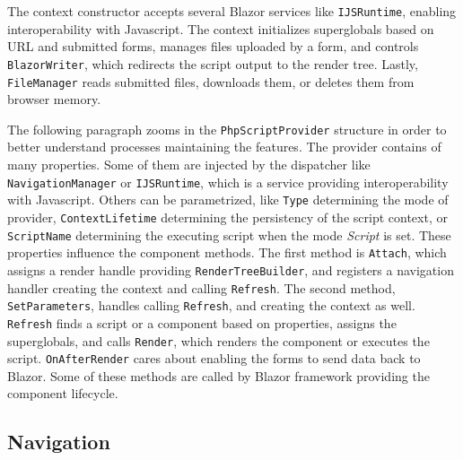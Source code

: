 The context constructor accepts several Blazor services like \texttt{IJSRuntime}, enabling interoperability with Javascript.
The context initializes superglobals based on URL and submitted forms, manages files uploaded by a form, and controls \texttt{BlazorWriter}, which redirects the script output to the render tree.
Lastly, \texttt{FileManager} reads submitted files, downloads them, or deletes them from browser memory.
\par
The following paragraph zooms in the \texttt{PhpScriptProvider} structure in order to better understand processes maintaining the features.
The provider contains of many properties.
Some of them are injected by the dispatcher like \texttt{NavigationManager} or \texttt{IJSRuntime}, which is a service providing interoperability with Javascript.
Others can be parametrized, like \texttt{Type} determining the mode of provider, \texttt{ContextLifetime} determining the persistency of the script context, or \texttt{ScriptName} determining the executing script when the mode \textit{Script} is set.
These properties influence the component methods.
The first method is \texttt{Attach}, which assigns a render handle providing \texttt{RenderTreeBuilder}, and registers a navigation handler creating the context and calling \texttt{Refresh}.
The second method, \texttt{SetParameters}, handles calling \texttt{Refresh}, and creating the context as well.
\texttt{Refresh} finds a script or a component based on properties, assigns the superglobals, and calls \texttt{Render}, which renders the component or executes the script.
\texttt{OnAfterRender} cares about enabling the forms to send data back to Blazor.
Some of these methods are called by Blazor framework providing the component lifecycle.

\subsection{Navigation}


